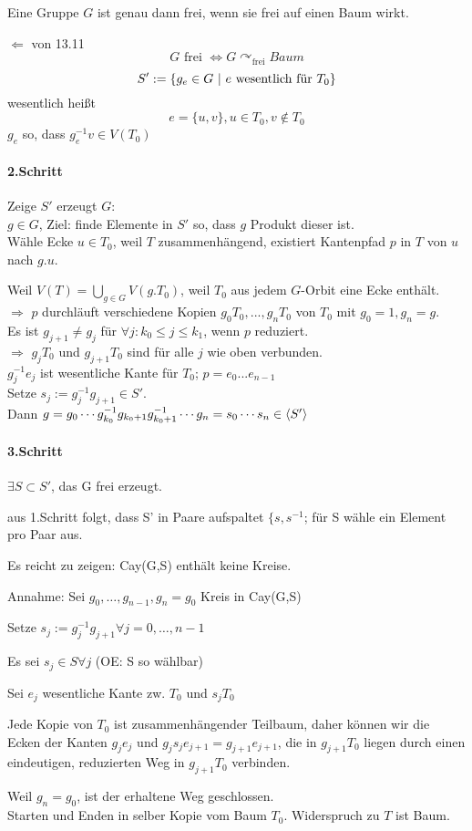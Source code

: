 \documentclass{article}
\begin{document}
\Satz{}
Eine Gruppe $G$ ist genau dann frei, wenn sie frei auf einen Baum wirkt.
\begin{Beweis}{$\Longleftarrow$ von 13.11}
\[G \text{ frei } \Longleftrightarrow G \curvearrowright_\text{frei} Baum \]
\[S' := \set{g_e \in G}{e \text{ wesentlich für }T_0} \]
wesentlich heißt
\[e = \{u,v\}, u \in T_0, v \notin T_0\]
$g_e$ so, dass $g_e^{-1} v \in V(T_0)$

\paragraph{2.Schritt}
Zeige $S'$ erzeugt $G$:\\

$g\in G$, Ziel: finde Elemente in $S'$ so, dass $g$ Produkt dieser ist.\\

Wähle Ecke $u \in T_0$, weil $T$ zusammenhängend, existiert Kantenpfad $p$ in $T$ von $u$ nach $g.u$.

Weil $V(T) = \bigcup_{g\in G} V(g.T_0)$, weil $T_0$ aus jedem $G$-Orbit eine Ecke enthält.\\
$\Longrightarrow$ $p$ durchläuft verschiedene Kopien $g_0T_0, ..., g_nT_0$ von $T_0$ mit $g_0 = 1, g_n = g$.\\
Es ist $g_{j+1} \neq g_j$ für $\forall j: k_0 \leq j \leq k_1$, wenn $p$ reduziert.\\
$\Rightarrow$ $g_jT_0$ und $g_{j+1}T_0$ sind für alle $j$ wie oben verbunden.\\
$g_j^{-1} e_j$ ist wesentliche Kante für $T_0$; $p = e_0...e_{n-1}$\\
Setze $s_j := g_j^{-1}g_{j+1} \in S'$.\\
Dann $g = g_0 \cdots g_{k_0}^{-1}g_{k_0 +1} g_{k_0 +1}^{-1} \cdots g_n = s_0 \cdots s_n \in \grp{S'}{}$

\paragraph{3.Schritt}
$\exists S \subset S'$, das G frei erzeugt.

aus 1.Schritt folgt, dass S' in Paare aufspaltet $\{s, s^{-1}$; für S wähle ein Element pro Paar aus.

Es reicht zu zeigen: Cay(G,S) enthält keine Kreise.

Annahme: Sei $g_0,\ldots, g_{n-1}, g_n = g_0$ Kreis in Cay(G,S)

Setze $s_j := g_j^{-1}g_{j+1} \forall j= 0, \ldots , n-1$

Es sei $s_j\in S \forall j$ (OE: S so wählbar)

Sei $e_j$ wesentliche Kante zw. $T_0$ und $s_jT_0$

Jede Kopie von $T_0$ ist zusammenhängender Teilbaum, daher können wir die Ecken der Kanten $g_je_j$ und $g_js_je_{j+1} = g_{j+1}e_{j+1}$, die in $g_{j+1}T_0$ liegen durch einen eindeutigen, reduzierten Weg in $g_{j+1}T_0$ verbinden.

Weil $g_n = g_0$, ist der erhaltene Weg geschlossen.\\
Starten und Enden in selber Kopie vom Baum $T_0$. Widerspruch zu $T$ ist Baum.
\end{Beweis}
\end{document}
